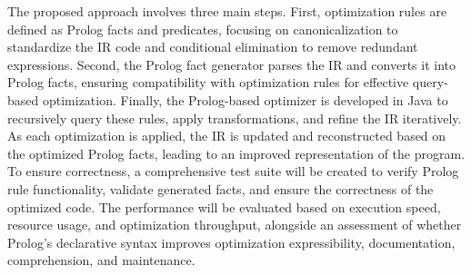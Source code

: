 The proposed approach involves three main steps. First, optimization rules are defined as Prolog facts and predicates, focusing on canonicalization to standardize the IR code and conditional elimination to remove redundant expressions. Second, the Prolog fact generator parses the IR and converts it into Prolog facts, ensuring compatibility with optimization rules for effective query-based optimization. Finally, the Prolog-based optimizer is developed in Java to recursively query these rules, apply transformations, and refine the IR iteratively. As each optimization is applied, the IR is updated and reconstructed based on the optimized Prolog facts, leading to an improved representation of the program. To ensure correctness, a comprehensive test suite will be created to verify Prolog rule functionality, validate generated facts, and ensure the correctness of the optimized code. The performance will be evaluated based on execution speed, resource usage, and optimization throughput, alongside an assessment of whether Prolog’s declarative syntax improves optimization expressibility, documentation, comprehension, and maintenance.
